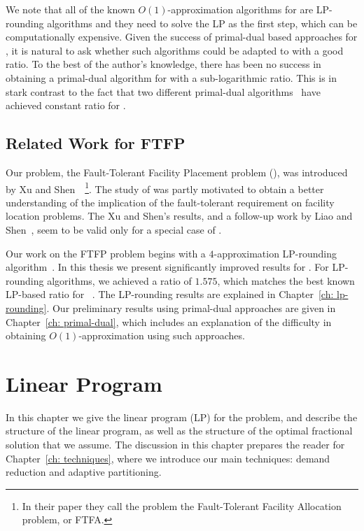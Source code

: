 \documentclass[oneside,final]{ucr}
\begin{document}
We note that all of the known $O(1)$-approximation
algorithms for {\FTFL} are LP-rounding algorithms and they
need to solve the LP as the first step, which can be
computationally expensive. Given the success of primal-dual
based approaches for {\UFL}, it is natural to ask whether
such algorithms could be adapted to {\FTFL} with a good
ratio. To the best of the author's knowledge, there has been
no success in obtaining a primal-dual algorithm for {\FTFL}
with a sub-logarithmic ratio. This is in stark contrast to
the fact that two different primal-dual
algorithms~\cite{JainV03,JainMMSV03} have achieved constant
ratio for {\UFL}.

\section{Related Work for FTFP}
Our problem, the Fault-Tolerant Facility Placement problem
(\FTFP), was introduced by Xu and
Shen~\cite{XuS09}~\footnote{In their paper they call the
  problem the Fault-Tolerant Facility Allocation problem, or
  FTFA.}. The study of {\FTFP} was partly motivated to
obtain a better understanding of the implication of the
fault-tolerant requirement on facility location
problems. The Xu and Shen's results, and a follow-up work by
Liao and Shen~\cite{LiaoS11}, seem to be valid only for a
special case of {\FTFP}.

Our work on the FTFP problem begins with a $4$-approximation
LP-rounding algorithm~\cite{YanC11}. In this thesis we
present significantly improved results for {\FTFP}. For
LP-rounding algorithms, we achieved a ratio of $1.575$,
which matches the best known LP-based ratio for
{\UFL}~\cite{ByrkaGS10}. The LP-rounding results are
explained in Chapter~\ref{ch: lp-rounding}. Our preliminary
results using primal-dual approaches are given in
Chapter~\ref{ch: primal-dual}, which includes an explanation
of the difficulty in obtaining $O(1)$-approximation using
such approaches.


\chapter{Linear Program} \label{ch: lp} 

In this chapter we give the linear program (LP) for the
{\FTFP} problem, and describe the structure of the linear
program, as well as the structure of the optimal fractional
solution that we assume. The discussion in this chapter
prepares the reader for Chapter~\ref{ch: techniques}, where
we introduce our main techniques: demand reduction and
adaptive partitioning.
\end{document}
